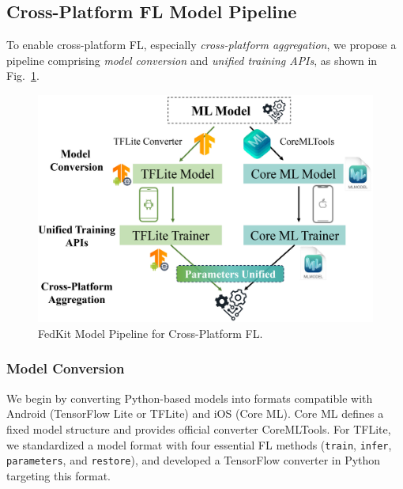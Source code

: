 \documentclass[letterpaper]{article} %
\begin{document}
\subsection{Cross-Platform FL Model Pipeline}

To enable cross-platform FL,
especially \textit{cross-platform aggregation},
we propose a pipeline comprising
\textit{model conversion} and
\textit{unified training APIs},
as shown in Fig.~\ref{cross_fl}.

\begin{figure}
    \centering
    \includegraphics*[width=\linewidth]{cross_smart_fl_workflow.pdf}
    \caption{FedKit Model Pipeline for Cross-Platform FL.}
    \label{cross_fl}
\end{figure}

\subsubsection{Model Conversion}
We begin by converting Python-based models into formats compatible with
Android (TensorFlow Lite or TFLite) and iOS (Core ML).
Core ML defines a fixed model structure and provides
official converter CoreMLTools.
For TFLite, we standardized a model format with four essential FL methods
(\lstinline{train}, \lstinline{infer}, \lstinline{parameters},
and \lstinline{restore}),
and developed a TensorFlow converter in Python targeting this format.
\end{document}
